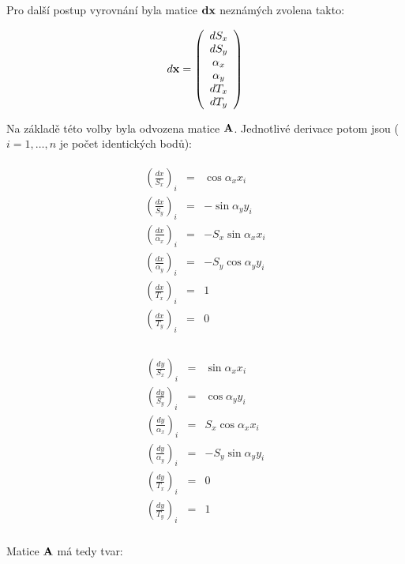 Pro další postup vyrovnání byla matice $\bf{dx}$ neznámých zvolena takto:


\begin{eqnarray} \label{dxafinni}
d {\bf x} = \left(
\begin{array}{c}
dS_{x} \\
dS_{y} \\
\alpha_{x} \\
\alpha_{y} \\
dT_{x} \\
dT_{y}
\end{array}
\right) 
\end{eqnarray}

Na základě této volby byla odvozena matice $\bf A$.  Jednotlivé derivace  potom
jsou ($i = 1, \ldots, n$ je počet identických bodů):

\begin{eqnarray}
\begin{array}{lll}
 \left(\frac{dx}{S_x}\right)_i &=& \cos{\alpha_{x}} x_i\\
 \left(\frac{dx}{S_y}\right)_i &=& -\sin{\alpha_{y}} y_i\\
 \left(\frac{dx}{\alpha_{x}}\right)_i &=& -S_{x} \sin{\alpha_{x}}  x_i\\
 \left(\frac{dx}{\alpha_{y}}\right)_i &=& -S_{y} \cos{\alpha_{y}}  y_i\\
 \left(\frac{dx}{T_x}\right)_i &=& 1 \\
 \left(\frac{dx}{T_y}\right)_i &=& 0 \\
\end{array}
\end{eqnarray}

\begin{eqnarray}
\begin{array}{lll}
 \left(\frac{dy}{S_x}\right)_i &=& \sin{\alpha_{x}} x_i\\
 \left(\frac{dy}{S_y}\right)_i &=& \cos{\alpha_{y}} y_i\\
 \left(\frac{dy}{\alpha_{x}}\right)_i &=& S_{x} \cos{\alpha_{x}}  x_i\\
 \left(\frac{dy}{\alpha_{y}}\right)_i &=& -S_{y} \sin{\alpha_{y}}  y_i\\
 \left(\frac{dy}{T_x}\right)_i &=& 0 \\
 \left(\frac{dy}{T_y}\right)_i &=& 1 \\
\end{array}
\end{eqnarray}

Matice ${\bf A}$ má tedy tvar:

